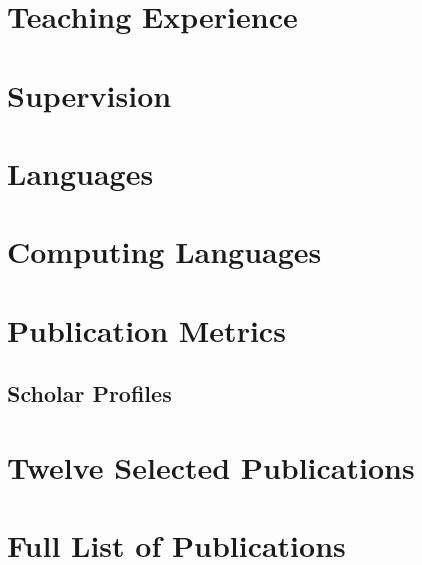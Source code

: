 \documentclass[10pt,a4paper]{article}
\begin{document}
\section*{Teaching Experience}%


\section*{Supervision}%


\section*{Languages}%


\section*{Computing Languages}%



















\newpage
\section*{Publication Metrics}%


\subsection*{Scholar Profiles}%


\section*{Twelve Selected Publications}%


\section*{Full List of Publications}%

\end{document}
